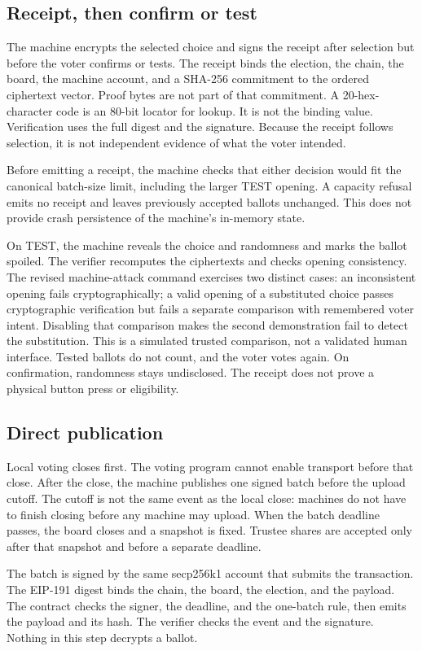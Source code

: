\documentclass[11pt]{article}
\begin{document}
\subsection{Receipt, then confirm or test}
The machine encrypts the selected choice and signs the receipt after selection but before the voter confirms or tests. The receipt binds the election, the chain, the board, the machine account, and a SHA-256 commitment to the ordered ciphertext vector. Proof bytes are not part of that commitment. A 20-hex-character code is an 80-bit locator for lookup. It is not the binding value. Verification uses the full digest and the signature. Because the receipt follows selection, it is not independent evidence of what the voter intended.

Before emitting a receipt, the machine checks that either decision would fit the canonical batch-size limit, including the larger TEST opening. A capacity refusal emits no receipt and leaves previously accepted ballots unchanged. This does not provide crash persistence of the machine's in-memory state.

On TEST, the machine reveals the choice and randomness and marks the ballot spoiled. The verifier recomputes the ciphertexts and checks opening consistency. The revised machine-attack command exercises two distinct cases: an inconsistent opening fails cryptographically; a valid opening of a substituted choice passes cryptographic verification but fails a separate comparison with remembered voter intent. Disabling that comparison makes the second demonstration fail to detect the substitution. This is a simulated trusted comparison, not a validated human interface. Tested ballots do not count, and the voter votes again. On confirmation, randomness stays undisclosed. The receipt does not prove a physical button press or eligibility.

\subsection{Direct publication}
Local voting closes first. The voting program cannot enable transport before that close. After the close, the machine publishes one signed batch before the upload cutoff. The cutoff is not the same event as the local close: machines do not have to finish closing before any machine may upload. When the batch deadline passes, the board closes and a snapshot is fixed. Trustee shares are accepted only after that snapshot and before a separate deadline.

The batch is signed by the same secp256k1 account that submits the transaction. The EIP-191 digest binds the chain, the board, the election, and the payload. The contract checks the signer, the deadline, and the one-batch rule, then emits the payload and its hash. The verifier checks the event and the signature. Nothing in this step decrypts a ballot.
\end{document}
